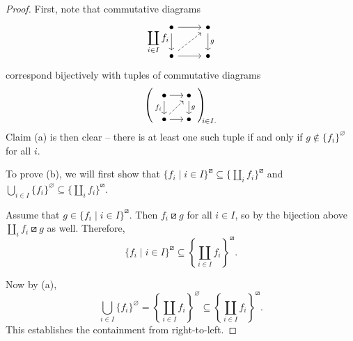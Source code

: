 \documentclass{amsart}
\renewcommand\emptyset\varnothing
\newcommand{\rlp}[1]{{#1}^{\boxslash}}
\numberwithin{equation}{section}
\theoremstyle{definition}
\begin{document}
\begin{proof}
	First, note that commutative diagrams
	\[\begin{tikzcd}[ampersand replacement=\&]
			\bullet \& \bullet \\
			\bullet \& \bullet
			\arrow[from=1-1, to=1-2]
			\arrow["{\displaystyle \coprod_{i\in I} f_i}"', from=1-1, to=2-1]
			\arrow["g", from=1-2, to=2-2]
			\arrow[dashed, from=2-1, to=1-2]
			\arrow[from=2-1, to=2-2]
		\end{tikzcd}\]
	correspond bijectively with tuples of commutative diagrams
	\begin{equation}
		\label{tuples of squares}
		\left(
		\begin{tikzcd}[ampersand replacement=\&, cramped, sep=5mm]
		\bullet \& \bullet \\
		\bullet \& \bullet
		\arrow[from=1-1, to=1-2]
		\arrow["{f_i}"', from=1-1, to=2-1]
		\arrow["g", from=1-2, to=2-2]
		\arrow[dashed, from=2-1, to=1-2]
		\arrow[from=2-1, to=2-2]
		\end{tikzcd}
		\right)_{\!\!\!i \in I.}
	\end{equation}
	Claim (a) is then clear -- there is at least one such tuple if and only if $g \notin \{f_i\}^\emptyset$ for all $i$.

	To prove (b), we will first show that $\{f_i \mid i \in I\}^\boxslash \subseteq \{\coprod_i f_i\}^\boxslash$ and $\bigcup_{i \in I} \{f_i\}^\emptyset \subseteq \{\coprod_i f_i\}^\boxslash$.

	Assume that $g \in \rlp{\{f_i \mid i \in I\}}$. Then $f_i \boxslash g$ for all $i \in I$, so by the bijection above $\coprod_i f_i \boxslash g$ as well. Therefore,
		\[
			\rlp{\{f_i \mid i \in I\}} \subseteq \rlp{\left\{\coprod_{i \in I} f_i\right\}}.
		\]

Now by (a),
	\begin{equation}
		\label{union of vacuous is coprod vacuous}
		\bigcup_{i \in I} \{f_i\}^\emptyset = \left\{\coprod_{i \in I} f_i\right\}^\emptyset \subseteq \rlp{\left\{\coprod_{i \in I} f_i\right\}}.
	\end{equation}
	This establishes the containment from right-to-left.
	

\end{proof}
\end{document}
